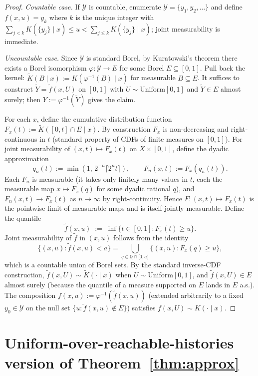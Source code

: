 \documentclass{article}
\theoremstyle{plain}
\theoremstyle{definition}
\theoremstyle{remark}
\newcommand{\Y}{\mathcal{Y}}
\begin{document}
\begin{proof}
\emph{Countable case.} If $\Y$ is countable, enumerate $\Y = \{y_1, y_2, \ldots\}$
and define $f(x, u) = y_k$ where $k$ is the unique integer with
$\sum_{j < k} K(\{y_j\} \mid x) \le u < \sum_{j \le k} K(\{y_j\} \mid x)$;
joint measurability is immediate.

\emph{Uncountable case.} Since $\Y$ is standard Borel, by Kuratowski's
theorem there exists a Borel isomorphism $\varphi : \Y \to E$ for some
Borel $E \subseteq [0, 1]$. Pull back the kernel:
$\widetilde K(B \mid x) := K(\varphi^{-1}(B) \mid x)$ for measurable
$B \subseteq E$. It suffices to construct $\widetilde Y = \widetilde f(x, U)$
on $[0, 1]$ with $U \sim \mathrm{Uniform}[0, 1]$ and
$\widetilde Y \in E$ almost surely; then $Y := \varphi^{-1}(\widetilde Y)$
gives the claim.

For each $x$, define the cumulative distribution function
$F_x(t) := \widetilde K([0, t] \cap E \mid x)$. By construction $F_x$ is
non-decreasing and right-continuous in $t$ (standard property of CDFs of
finite measures on $[0, 1]$). For joint measurability of
$(x, t) \mapsto F_x(t)$ on $X \times [0, 1]$, define the dyadic
approximation
\[
q_n(t) := \min(1,\, 2^{-n} \lceil 2^n t \rceil),
\qquad
F_n(x, t) := F_x(q_n(t)).
\]
Each $F_n$ is measurable (it takes only finitely many values in $t$, each
the measurable map $x \mapsto F_x(q)$ for some dyadic rational $q$), and
$F_n(x, t) \to F_x(t)$ as $n \to \infty$ by right-continuity. Hence
$F : (x, t) \mapsto F_x(t)$ is the pointwise limit of measurable maps and
is itself jointly measurable. Define the quantile
\[
\widetilde f(x, u) \;:=\; \inf\{ t \in [0, 1] : F_x(t) \ge u \}.
\]
Joint measurability of $\widetilde f$ in $(x, u)$ follows from the identity
\[
\{(x, u) : \widetilde f(x, u) < a\} = \bigcup_{q \in \mathbb{Q} \cap [0, a)} \{(x, u) : F_x(q) \ge u\},
\]
which is a countable union of Borel sets. By the standard inverse-CDF
construction, $\widetilde f(x, U) \sim \widetilde K(\cdot \mid x)$ when
$U \sim \mathrm{Uniform}[0, 1]$, and $\widetilde f(x, U) \in E$ almost surely
(because the quantile of a measure supported on $E$ lands in $E$ a.s.). The
composition $f(x, u) := \varphi^{-1}(\widetilde f(x, u))$ (extended
arbitrarily to a fixed $y_0 \in \Y$ on the null set $\{u : \widetilde f(x, u) \notin E\}$)
satisfies $f(x, U) \sim K(\cdot \mid x)$.
\end{proof}

\section{Uniform-over-reachable-histories version of Theorem~\ref{thm:approx}}\label{app:uniform-version}
\end{document}
